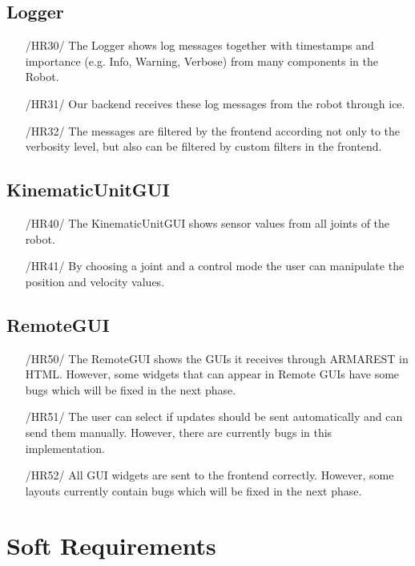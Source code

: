 \subsection*{Logger}
\begin{enumerate}
    \item[/HR30/] The Logger shows log messages together with timestamps and importance (e.g. Info, Warning, Verbose) from many components in the Robot.
    \item[/HR31/] Our \gls{backend} receives these log messages from the robot through \gls{ice}.
    \item[/HR32/] The messages are filtered by the \gls{frontend} according not only to the verbosity level, but also can be filtered by custom filters in the \gls{frontend}.
\end{enumerate}

\subsection*{KinematicUnitGUI}
\begin{enumerate}
    \item[/HR40/] The KinematicUnitGUI shows sensor values from all joints of the robot.
    \item[/HR41/] By choosing a joint and a control mode the user can manipulate the position and velocity values.
\end{enumerate}

\subsection*{RemoteGUI}
\begin{enumerate}
    \item[/HR50/] The RemoteGUI shows the GUIs it receives through ARMAREST in HTML. However, some widgets that can appear in Remote GUIs have some bugs which will be fixed in the next phase.
    \item[/HR51/] The user can select if updates should be sent automatically and can send them manually. However, there are currently bugs in this implementation.
    \item[/HR52/] All GUI widgets are sent to the frontend correctly. However, some layouts currently contain bugs which will be fixed in the next phase.
\end{enumerate}

\section{Soft Requirements}

